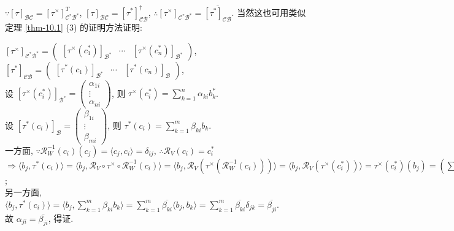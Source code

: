 \documentclass{note}
\begin{document}
$\because[\tau]_{\mathcal{BC}}=[\tau^{\times}]_{\mathcal{C}^*\mathcal{B}^*}^T$, $[\tau]_{\mathcal{BC}}=[\tau^*]_{\mathcal{CB}}^{\dagger}$, $\therefore[\tau^{\times}]_{\mathcal{C}^*\mathcal{B}^*}=\overline{[\tau^*]_{\mathcal{CB}}}$. 当然这也可用类似定理 \ref{thm-10.1} (3) 的证明方法证明:
\begin{pf}
    $[\tau^{\times}]_{\mathcal{C}^*\mathcal{B}^*}=\begin{pmatrix}
        [\tau^{\times}(c_1^*)]_{\mathcal{B}^*}&\cdots&[\tau^{\times}(c_n^*)]_{\mathcal{B}^*}
    \end{pmatrix}$, $[\tau^*]_{\mathcal{CB}}=\begin{pmatrix}
        [\tau^*(c_1)]_{\mathcal{B}^*}&\cdots&[\tau^*(c_n)]_{\mathcal{B}}
    \end{pmatrix}$,\\
    设 $[\tau^{\times}(c_i^*)]_{\mathcal{B}^*}=\begin{pmatrix}
        \alpha_{1i}\\
        \vdots\\
        \alpha_{ni}
    \end{pmatrix}$, 则 $\tau^{\times}(c_i^*)=\sum_{k=1}^n\alpha_{ki}b_k^*$.\\
    设 $[\tau^*(c_i)]_{\mathcal{B}}=\begin{pmatrix}
        \beta_{1i}\\
        \vdots\\
        \beta_{mi}
    \end{pmatrix}$, 则 $\tau^*(c_i)=\sum_{k=1}^m\beta_{ki}b_k$.\\
    一方面, $\because\mathcal{R}_W^{-1}(c_i)(c_j)=\langle c_j,c_i\rangle=\delta_{ij}$, $\therefore\mathcal{R}_V(c_i)=c_i^*$\\
    $\Longrightarrow\langle b_j,\tau^*(c_i)\rangle=\langle b_j,\mathcal{R}_V\circ\tau^{\times}\circ\mathcal{R}_W^{-1}(c_i)\rangle=\langle b_j,\mathcal{R}_V(\tau^{\times}(\mathcal{R}_W^{-1}(c_i)))\rangle=\langle b_j,\mathcal{R}_V(\tau^{\times}(c_i^*))\rangle=\tau^{\times}(c_i^*)(b_j)=\left(\sum_{k=1}^n\alpha_{ki}b_k^*\right)(b_j)=\sum_{k=1}^n\alpha_{ki}b_k^*(b_j)=\sum_{k=1}^n\alpha_{ki}\delta_{jk}=\alpha_{ji}$;\\
    另一方面, $\langle b_j,\tau^*(c_i)\rangle=\langle b_j,\sum_{k=1}^m\beta_{ki}b_k\rangle=\sum_{k=1}^m\overline{\beta_{ki}}\langle b_j,b_k\rangle=\sum_{k=1}^m\overline{\beta_{ki}}\delta_{jk}=\overline{\beta_{ji}}$.\\
    故 $\alpha_{ji}=\overline{\beta_{ji}}$, 得证.
\end{pf}
\end{document}
